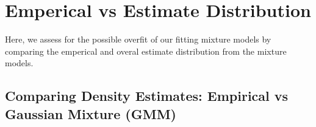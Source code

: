 \documentclass{article}\usepackage[]{graphicx}\usepackage[]{color}
\begin{document}
\section{Emperical vs Estimate Distribution}
Here, we assess for the possible overfit of our fitting mixture models by comparing the emperical and overal estimate distribution from the mixture models.

\subsection{Comparing Density Estimates: Empirical vs Gaussian Mixture (GMM)}
\begin{figure}[!htp]
    \centering
    \\

\end{figure}
\end{document}
